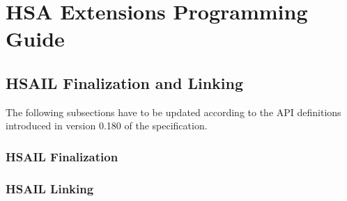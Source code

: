 \documentclass[final]{book}
\newcommand{\reftyp}[1]{#1}
\begin{document}

%


\chapter{HSA Extensions Programming Guide}

\section{HSAIL Finalization and Linking}
\label{finalizerchapter} \hypertarget{finalizerchapter}{}

The following subsections have to be updated according to the API definitions
introduced in version 0.180 of the specification.


\hypertarget{finalizer}{}\subsection{HSAIL Finalization}\label{finalizer}

\hypertarget{linking}{}\subsection{HSAIL Linking}\label{linking}



\end{document}
